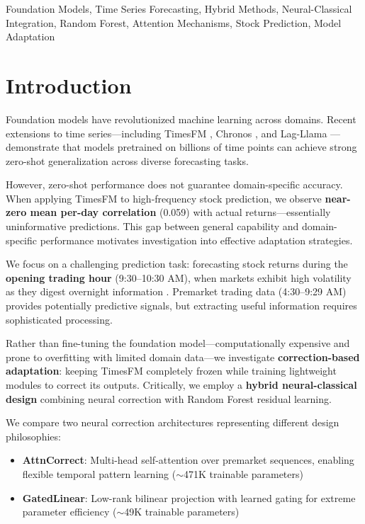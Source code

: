 \documentclass[10pt,conference]{IEEEtran}
\newcommand{\rev}[1]{#1}
\begin{document}
\begin{IEEEkeywords}
Foundation Models, Time Series Forecasting, Hybrid Methods, Neural-Classical Integration, Random Forest, Attention Mechanisms, Stock Prediction, Model Adaptation
\end{IEEEkeywords}

\section{Introduction}

Foundation models have revolutionized machine learning across domains. Recent extensions to time series---including TimesFM \cite{das2024decoder}, Chronos \cite{ansari2024chronos}, and Lag-Llama \cite{rasul2024lagllama}---demonstrate that models pretrained on billions of time points can achieve strong zero-shot generalization across diverse forecasting tasks.

However, zero-shot performance does not guarantee domain-specific accuracy. When applying TimesFM to high-frequency stock prediction, we observe \textbf{near-zero \rev{mean per-day} correlation} (\rev{0.059}) with actual returns---essentially uninformative predictions. This gap between general capability and domain-specific performance motivates investigation into effective adaptation strategies.

We focus on a challenging prediction task: forecasting stock returns during the \textbf{opening trading hour} (9:30--10:30 AM), when markets exhibit high volatility as they digest overnight information \cite{hasbrouck2013low}. Premarket trading data (4:30--9:29 AM) provides potentially predictive signals, but extracting useful information requires sophisticated processing.

Rather than fine-tuning the foundation model---computationally expensive and prone to overfitting with limited domain data---we investigate \textbf{correction-based adaptation}: keeping TimesFM completely frozen while training lightweight modules to correct its outputs. Critically, we employ a \textbf{hybrid neural-classical design} combining neural correction with Random Forest \cite{breiman2001random} residual learning.

We compare two neural correction architectures representing different design philosophies:

\begin{itemize}
    \item \textbf{AttnCorrect}: Multi-head self-attention \cite{vaswani2017attention} over premarket sequences, enabling flexible temporal pattern learning (${\sim}$471K trainable parameters)
    \item \textbf{GatedLinear}: Low-rank bilinear projection \cite{tenenbaum2000separating} with learned gating for extreme parameter efficiency (${\sim}$49K trainable parameters)
\end{itemize}
\end{document}
